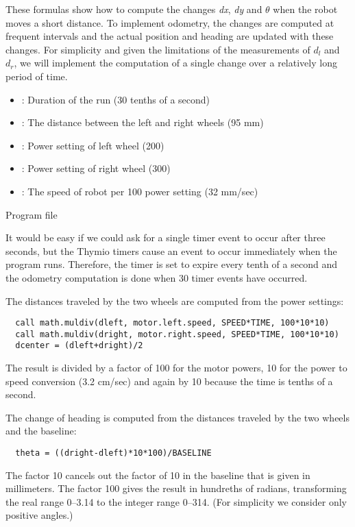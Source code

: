 These formulas show how to compute the changes \textit{dx}, \textit{dy} and
$\theta$ when the robot moves a short distance.
To implement odometry,
the changes are computed at frequent intervals
and the actual position and heading
are updated with these changes.
For simplicity and given the limitations of the measurements of $d_l$ and $d_r$,
we will implement the computation of
a single change over a relatively long period of time.


\begin{itemize}
\item {}: Duration of the run (30 tenths of a second)
\item {}: The distance between the left and right wheels (95 mm)
\item {}: Power setting of left wheel (200)
\item {}: Power setting of right wheel (300)
\item {}: The speed of robot per 100 power setting (32 mm/sec)
\end{itemize}


{\raggedleft \hfill Program file }

It would be easy if we could ask for a single timer event to occur
after three seconds, but the Thymio timers cause an event to occur
immediately when the program runs.
Therefore, the timer is set to expire every tenth of a second and the
odometry computation is done when 30 timer events have occurred.

The distances traveled by the two wheels are computed from the power settings:
\begin{verbatim}
  call math.muldiv(dleft, motor.left.speed, SPEED*TIME, 100*10*10)
  call math.muldiv(dright, motor.right.speed, SPEED*TIME, 100*10*10)
  dcenter = (dleft+dright)/2
\end{verbatim}
The result is divided by a factor of 100 for the motor powers,
10 for the power to speed conversion (3.2 cm/sec) and again by 10
because the time is tenths of a second.

The change of heading is computed from the distances traveled by the two wheels
and the baseline:
\begin{verbatim}
  theta = ((dright-dleft)*10*100)/BASELINE
\end{verbatim}
The factor 10 cancels out the factor of 10 in the baseline that
is given in millimeters.
The factor 100 gives the result in hundreths of radians,
transforming the real range 0--3.14 to the integer range 0--314.
(For simplicity we consider only positive angles.)


